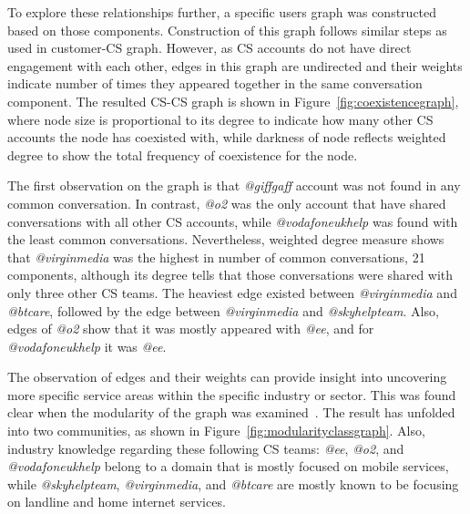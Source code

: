 \documentclass[sigconf]{acmart}
\begin{document}
{To explore these relationships further, a specific users graph was
constructed based on those components. Construction of this graph
follows similar steps as used in customer-CS graph. However, as CS
accounts do not have direct engagement with each other, edges in this
graph are undirected and their weights indicate number of times they
appeared together in the same conversation component.  The resulted
CS-CS graph is shown in Figure~\ref{fig:coexistencegraph}, where node
size is proportional to its degree to indicate how many other CS accounts the
node has coexisted with, while darkness of node reflects weighted
degree to show the total frequency of coexistence for the node.

The first observation on the graph is that {\emph{@giffgaff}} account
was not found in any common conversation. In contrast, {\emph{@o2}}
was the only account that have shared conversations with all other CS
accounts, while {\emph{@vodafoneukhelp}} was found with the least
common conversations. Nevertheless, weighted degree measure shows that
{\emph{@virginmedia}} was the highest in number of common
conversations, 21 components, although its degree tells that those
conversations were shared with only three other CS teams. The heaviest
edge existed between {\emph{@virginmedia}} and {\emph{@btcare}},
followed by the edge between {\emph{@virginmedia}} and
{\emph{@skyhelpteam}}. Also, edges of {\emph{@o2}} show that it was
mostly appeared with {\emph{@ee}}, and for {\emph{@vodafoneukhelp}} it
was {\emph{@ee}}.

The observation of edges and their weights can provide insight into
uncovering more specific service areas within the specific industry or
sector. This was found clear when the modularity of the graph was
examined~\cite{Blondel2008}. The result has unfolded into two
communities, as shown in Figure~\ref{fig:modularityclassgraph}. Also,
industry knowledge regarding these following CS teams: {\emph{@ee}},
{\emph{@o2}}, and {\emph{@vodafoneukhelp}} belong to a domain that is
mostly focused on mobile services, while {\emph{@skyhelpteam}},
{\emph{@virginmedia}}, and {\emph{@btcare}} are mostly known to be
focusing on landline and home internet services.

}
\end{document}
